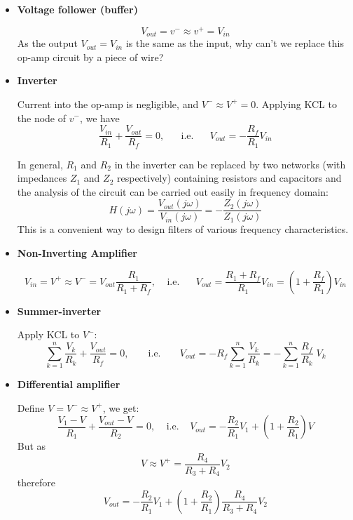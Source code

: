 
\begin{itemize}
\item {\bf Voltage follower (buffer)}


\[ V_{out}=v^-\approx v^+=V_{in} \]
As the output $V_{out}=V_{in}$ is the same as the input, why can't we replace this
op-amp circuit by a piece of wire?

\item {\bf Inverter}


Current into the op-amp is negligible, and $V^-\approx V^+=0$. Applying KCL to the 
node of $v^-$, we have
\[ \frac{V_{in}}{R_1}+\frac{V_{out}}{R_f}=0,\;\;\;\;\;\;\mbox{i.e.}\;\;\;\;\;\;
V_{out}=-\frac{R_f}{R_1}V_{in}	\]

In general, $R_1$ and $R_2$ in the inverter can be replaced by two networks
(with impedances $Z_1$ and $Z_2$ respectively) containing resistors and capacitors 
and the analysis of the circuit can be carried out easily in frequency domain:
\[
H(j\omega)=\frac{V_{out}(j\omega)}{V_{in}(j\omega)}=-\frac{Z_2(j\omega)}{Z_1(j\omega)}
\]
This is a convenient way to design filters of various frequency characteristics.



\item {\bf Non-Inverting Amplifier}


  \[ V_{in}=V^+\approx V^-=V_{out}\frac{R_1}{R_1+R_f},\;\;\;\;\mbox{i.e.}
  \;\;\;\;\;\;V_{out}=\frac{R_1+R_f}{R_1}V_{in}=\left(1+\frac{R_f}{R_1}\right) V_{in} \]

\item {\bf Summer-inverter}


  Apply KCL to $V^-$:
  \[ \sum_{k=1}^n \frac{V_k}{R_k}+\frac{V_{out}}{R_f}=0,\;\;\;\;\;\;\;
  \mbox{i.e.}\;\;\;\;\;\;\;V_{out}=-R_f \sum_{k=1}^n \frac{V_k}{R_k}
  =- \sum_{k=1}^n \frac{R_f}{R_k} \;V_k  \]

\item {\bf Differential amplifier}


  Define $V=V^-\approx V^+$, we get:
  \[ \frac{V_1-V}{R_1}+\frac{V_{out}-V}{R_2}=0,\;\;\;\;\mbox{i.e.}\;\;\;\;
  V_{out}=-\frac{R_2}{R_1}V_1+\left(1+\frac{R_2}{R_1}\right) V \]
  But as
  \[ V\approx V^+=\frac{R_4}{R_3+R_4}V_2 \]
  therefore
  \[ V_{out}=-\frac{R_2}{R_1}V_1+\left(1+\frac{R_2}{R_1}\right)\frac{R_4}{R_3+R_4}V_2 \]


\end{itemize}
